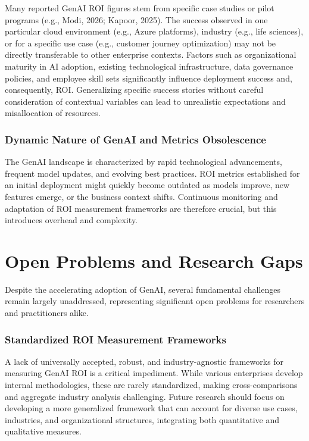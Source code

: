 \documentclass[10pt,journal,compsoc,twocolumn]{IEEEtran}
\begin{document}
Many reported GenAI ROI figures stem from specific case studies or pilot programs (e.g., Modi, 2026; Kapoor, 2025). The success observed in one particular cloud environment (e.g., Azure platforms), industry (e.g., life sciences), or for a specific use case (e.g., customer journey optimization) may not be directly transferable to other enterprise contexts. Factors such as organizational maturity in AI adoption, existing technological infrastructure, data governance policies, and employee skill sets significantly influence deployment success and, consequently, ROI. Generalizing specific success stories without careful consideration of contextual variables can lead to unrealistic expectations and misallocation of resources.


\subsubsection{Dynamic Nature of GenAI and Metrics Obsolescence}

The GenAI landscape is characterized by rapid technological advancements, frequent model updates, and evolving best practices. ROI metrics established for an initial deployment might quickly become outdated as models improve, new features emerge, or the business context shifts. Continuous monitoring and adaptation of ROI measurement frameworks are therefore crucial, but this introduces overhead and complexity.


\section{Open Problems and Research Gaps}


Despite the accelerating adoption of GenAI, several fundamental challenges remain largely unaddressed, representing significant open problems for researchers and practitioners alike.


\subsubsection{Standardized ROI Measurement Frameworks}

A lack of universally accepted, robust, and industry-agnostic frameworks for measuring GenAI ROI is a critical impediment. While various enterprises develop internal methodologies, these are rarely standardized, making cross-comparisons and aggregate industry analysis challenging. Future research should focus on developing a more generalized framework that can account for diverse use cases, industries, and organizational structures, integrating both quantitative and qualitative measures.
\end{document}
